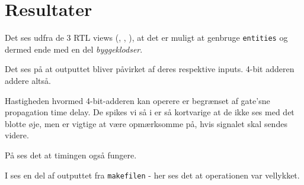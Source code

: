 \section{Resultater}


Det ses udfra de 3 RTL views (, , ), at det er muligt at genbruge \texttt{entities} og dermed ende med en del \textit{byggeklodser}.



Det ses på  at outputtet bliver påvirket af deres respektive inputs. 4-bit adderen addere altså.

Hastigheden hvormed 4-bit-adderen kan operere er begrænset af gate'sne propagation time delay. De spikes vi så i  er så kortvarige at de ikke ses med det blotte øje, men er vigtige at være opmærksomme på, hvis signalet skal sendes videre.

På  ses det at timingen også fungere.

I  ses en del af outputtet fra \texttt{makefilen} -
her ses det at operationen var vellykket.

